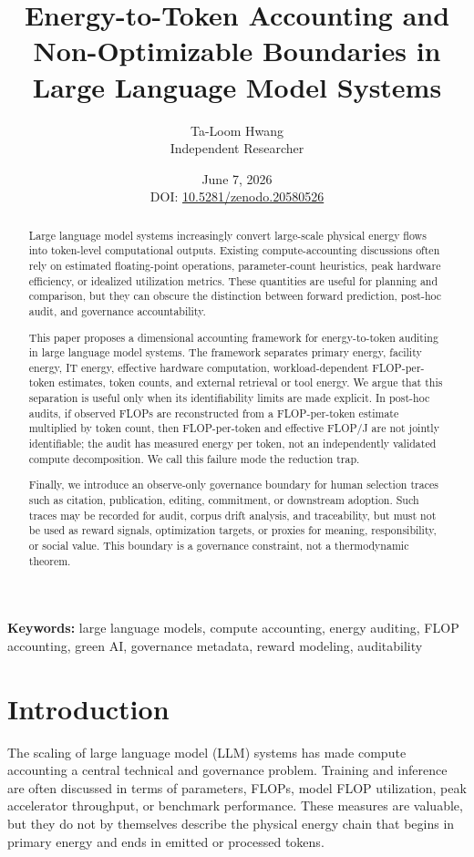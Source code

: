 \documentclass[11pt]{article}
\title{Energy-to-Token Accounting and Non-Optimizable Boundaries in Large Language Model Systems}
\author{Ta-Loom Hwang\\Independent Researcher}
\date{June 7, 2026\\\small DOI: \href{https://doi.org/10.5281/zenodo.20580526}{10.5281/zenodo.20580526}}
\begin{document}
\maketitle

\begin{abstract}
Large language model systems increasingly convert large-scale physical energy flows into token-level computational outputs. Existing compute-accounting discussions often rely on estimated floating-point operations, parameter-count heuristics, peak hardware efficiency, or idealized utilization metrics. These quantities are useful for planning and comparison, but they can obscure the distinction between forward prediction, post-hoc audit, and governance accountability.

This paper proposes a dimensional accounting framework for energy-to-token auditing in large language model systems. The framework separates primary energy, facility energy, IT energy, effective hardware computation, workload-dependent FLOP-per-token estimates, token counts, and external retrieval or tool energy. We argue that this separation is useful only when its identifiability limits are made explicit. In post-hoc audits, if observed FLOPs are reconstructed from a FLOP-per-token estimate multiplied by token count, then FLOP-per-token and effective FLOP/J are not jointly identifiable; the audit has measured energy per token, not an independently validated compute decomposition. We call this failure mode the reduction trap.

Finally, we introduce an observe-only governance boundary for human selection traces such as citation, publication, editing, commitment, or downstream adoption. Such traces may be recorded for audit, corpus drift analysis, and traceability, but must not be used as reward signals, optimization targets, or proxies for meaning, responsibility, or social value. This boundary is a governance constraint, not a thermodynamic theorem.
\end{abstract}

\noindent\textbf{Keywords:} large language models, compute accounting, energy auditing, FLOP accounting, green AI, governance metadata, reward modeling, auditability

\section{Introduction}

The scaling of large language model (LLM) systems has made compute accounting a central technical and governance problem. Training and inference are often discussed in terms of parameters, FLOPs, model FLOP utilization, peak accelerator throughput, or benchmark performance. These measures are valuable, but they do not by themselves describe the physical energy chain that begins in primary energy and ends in emitted or processed tokens.
\end{document}
